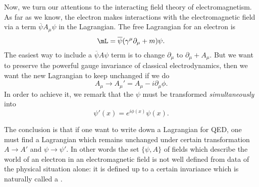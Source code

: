 Now, we turn our attentions to the interacting field theory of electromagnetism. As far as we know, the electron makes interactions with the electromagnetic field via a term $\overline{ \psi } A_{\mu}\psi$ in the Lagrangian. The free Lagrangian for an electron is
%
%
\begin{equation}\label{eq:freeL}
\mL=\overline{ \psi }(\gamma^{\mu}\partial_{\mu}+m)\psi.
\end{equation}
%
 The easiest way to include a $\overline{ \psi } A\psi$ term is to change $\partial_{\mu}$ to $\partial_{\mu}+A_{\mu}$. But we want to preserve the powerful gauge invariance of classical electrodynamics, then we want the new Lagrangian to keep unchanged if we do
 \begin{equation} \label{eq_jaugeA_em}
 A_{\mu}\rightarrow A_{\mu}'=A_{\mu}-i\partial_{\mu}\phi.
 \end{equation}
  In order to achieve it, we remark that the $\psi$ must be transformed \textit{simultaneously} into
\begin{equation}\label{eq:jaugepsi_em}
 \psi'(x)=e^{i\phi(x)}\psi(x).
\end{equation}

The conclusion is that if one want to write down a Lagrangian for QED, one must find a Lagrangian which remains unchanged under certain transformation $A\rightarrow A'$ and $\psi\rightarrow\psi'$. In other words the set $\{\psi,A\}$ of fields which describe the world of an electron in an electromagnetic field is not well defined from data of the physical situation alone: it is defined up to a certain invariance which is naturally called a .


